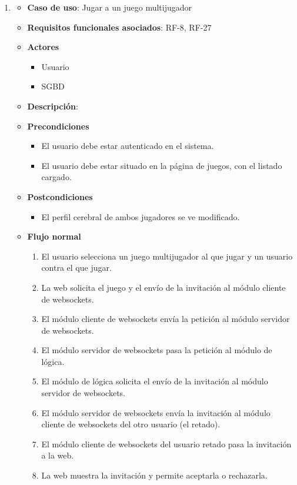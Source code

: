 \begin{enumerate}
\item %
  \begin{itemize}
  \item \textbf{Caso de uso}: Jugar a un juego multijugador
  \item \textbf{Requisitos funcionales asociados}: RF-8, RF-27
  \item \textbf{Actores}
    \begin{itemize}
    \item Usuario
    \item SGBD
    \end{itemize}
  \item \textbf{Descripción}: 
  \item \textbf{Precondiciones}
    \begin{itemize}
    \item El usuario debe estar autenticado en el sistema.
    \item El usuario debe estar situado en la página de juegos, con el listado cargado.
    \end{itemize}
  \item \textbf{Postcondiciones}
    \begin{itemize}
    \item El perfil cerebral de ambos jugadores se ve modificado.
    \end{itemize}
  \item \textbf{Flujo normal}
    \begin{enumerate}
    \item El usuario selecciona un juego multijugador al que jugar y un usuario contra el que jugar.
    \item La web solicita el juego y el envío de la invitación al módulo cliente de websockets.
    \item El módulo cliente de websockets envía la petición al módulo servidor de websockets.
    \item El módulo servidor de websockets pasa la petición al módulo de lógica.
    \item El módulo de lógica solicita el envío de la invitación al módulo servidor de websockets.
    \item El módulo servidor de websockets envía la invitación al módulo cliente de websockets del otro usuario (el retado).
    \item El módulo cliente de websockets del usuario retado pasa la invitación a la web.
    \item La web muestra la invitación y permite aceptarla o rechazarla.

\end{enumerate}
\end{itemize}
\end{enumerate}
